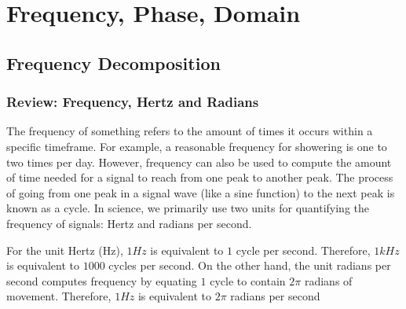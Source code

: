 \chapter{Frequency, Phase, Domain}

\section{Frequency Decomposition}
\subsection{Review: Frequency, Hertz and Radians}
The frequency of something refers to the amount of times it occurs within a specific timeframe.
For example, a reasonable frequency for showering is one to two times per day.
However, frequency can also be used to compute the amount of time needed for a signal to reach from one peak to another peak.
The process of going from one peak in a signal wave (like a sine function) to the next peak is known as a cycle.
In science, we primarily use two units for quantifying the frequency of signals: Hertz and radians per second.

For the unit Hertz (Hz), $1 Hz$ is equivalent to $1$ cycle per second. Therefore, $1kHz$ is equivalent to $1000$ cycles per second.
On the other hand, the unit radians per second computes frequency by equating $1$ cycle to contain $2 \pi$ radians of movement.
Therefore, $1 Hz$ is equivalent to $2\pi$ radians per second

